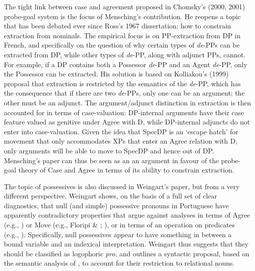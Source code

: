 \documentclass[output=paper]{langsci/langscibook}
\begin{document}
The tight link between case and agreement proposed in Chomsky’s (2000, 2001) probe-goal system is the focus of Mensching’s contribution. He reopens a topic that has been debated ever since Ross’s 1967 dissertation: how to constrain extraction from nominals. The empirical focus is on PP-extraction from DP in French, and specifically on the question of why certain types of \textit{de}{}-PPs can be extracted from DP, while other types of \textit{de}{}-PP, along with adjunct PPs, cannot. For example, if a DP contains both a Possessor \textit{de}{}-PP and an Agent \textit{de}{}-PP, only the Possessor can be extracted. His solution is based on Kolliakou’s (1999) proposal that extraction is restricted by the semantics of the \textit{de}{}-PP, which has the consequence that if there are two \textit{de}{}-PPs, only one can be an argument; the other must be an adjunct. The argument/adjunct distinction in extraction is then accounted for in terms of case-valuation: DP-internal arguments have their case feature valued as genitive under Agree with D, while DP-internal adjuncts do not enter into case-valuation. Given the idea that SpecDP is an ‘escape hatch’ for movement that only accommodates XPs that enter an Agree relation with D, only arguments will be able to move to SpecDP and hence out of DP. Mensching’s paper can thus be seen as an an argument in favour of the probe-goal theory of Case and Agree in terms of its ability to constrain extraction.

The topic of possessives is also discussed in Weingart’s paper, but from a very different perspective. Weingart shows, on the basis of a full set of clear diagnostics, that null (and simple) possessive pronouns in Portuguese have apparently contradictory properties that argue against analyses in terms of Agree (e.g., \citealt{Hicks2009}) or Move (e.g., Floripi \& \citealt{Nunes2009}; \citealt{Rodrigues2010}), or in terms of an operation on predicates (e.g., \citealt{Reinhart2006}). Specifically, null possessives appear to have something in between a bound variable and an indexical interpretation. Weingart thus suggests that they should be classified as logophoric \textit{pro}, and outlines a syntactic proposal, based on the semantic analysis of \citet{Partee1997}, to account for their restriction to relational nouns.
\end{document}

